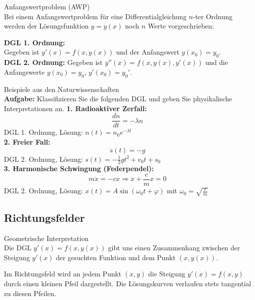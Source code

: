 \begin{definition}{Anfangswertproblem (AWP)}\\
Bei einem Anfangswertproblem für eine Differentialgleichung $n$-ter Ordnung werden der Lösungsfunktion $y = y(x)$ noch $n$ Werte vorgeschrieben:

\textbf{DGL 1. Ordnung:} \\
Gegeben ist $y'(x) = f(x, y(x))$ und der Anfangswert $y(x_0) = y_0$.
\vspace{2mm}\\
\textbf{DGL 2. Ordnung:} 
Gegeben ist $y''(x) = f(x, y(x), y'(x))$ und die Anfangswerte $y(x_0) = y_0$, $y'(x_0) = y_0'$.
\end{definition}

\begin{example2}{Beispiele aus den Naturwissenschaften}\\
\textbf{Aufgabe:} Klassifizieren Sie die folgenden DGL und geben Sie physikalische Interpretationen an.
\tcblower
\textbf{1. Radioaktiver Zerfall:}
$$\frac{dn}{dt} = -\lambda n$$
DGL 1. Ordnung, Lösung: $n(t) = n_0 e^{-\lambda t}$
\vspace{2mm}\\
\textbf{2. Freier Fall:}
$$\ddot{s}(t) = -g$$
DGL 2. Ordnung, Lösung: $s(t) = -\frac{1}{2}gt^2 + v_0 t + s_0$
\vspace{2mm}\\
\textbf{3. Harmonische Schwingung (Federpendel):}
$$m\ddot{x} = -cx \Rightarrow \ddot{x} + \frac{c}{m}x = 0$$
DGL 2. Ordnung, Lösung: $x(t) = A \sin(\omega_0 t + \varphi)$ mit $\omega_0 = \sqrt{\frac{c}{m}}$
\end{example2}

\raggedcolumns
\columnbreak

\subsection{Richtungsfelder}

\begin{concept}{Geometrische Interpretation}\\
Die DGL $y'(x) = f(x, y(x))$ gibt uns einen Zusammenhang zwischen der Steigung $y'(x)$ der gesuchten Funktion und dem Punkt $(x, y(x))$.

Im Richtungsfeld wird an jedem Punkt $(x,y)$ die Steigung $y'(x) = f(x,y)$ durch einen kleinen Pfeil dargestellt. Die Lösungskurven verlaufen stets tangential zu diesen Pfeilen.
\end{concept}

